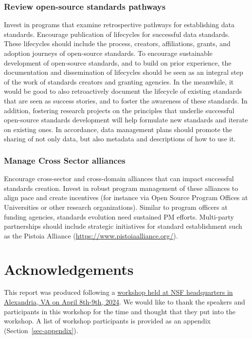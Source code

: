 \documentclass[
  number]{elsarticle}
\begin{document}
\subsubsection{Review open-source standards
pathways}\label{review-open-source-standards-pathways}

Invest in programs that examine retrospective pathways for establishing
data standards. Encourage publication of lifecycles for successful data
standards. These lifecycles should include the process, creators,
affiliations, grants, and adoption journeys of open-source standards. To
encourage sustainable development of open-source standards, and to build
on prior experience, the documentation and dissemination of lifecycles
should be seen as an integral step of the work of standards creators and
granting agencies. In the meanwhile, it would be good to also
retroactively document the lifecycle of existing standards that are seen
as success stories, and to foster the awareness of these standards. In
addition, fostering research projects on the principles that underlie
successful open-source standards development will help formulate new
standards and iterate on existing ones. In accordance, data management
plans should promote the sharing of not only data, but also metadata and
descriptions of how to use it.

\subsubsection{Manage Cross Sector
alliances}\label{manage-cross-sector-alliances}

Encourage cross-sector and cross-domain alliances that can impact
successful standards creation. Invest in robust program management of
these alliances to align pace and create incentives (for instance via
Open Source Program Offices at Universities or other research
organizations). Similar to program officers at funding agencies,
standards evolution need sustained PM efforts. Multi-party partnerships
should include strategic initiatives for standard establishment such as
the Pistoia Alliance (\url{https://www.pistoiaalliance.org/}).

\section{Acknowledgements}\label{acknowledgements}

This report was produced following a
\href{https://uwescience.github.io/2024-open-source-standards-workshop/}{workshop
held at NSF headquarters in Alexandria, VA on April 8th-9th, 2024}. We
would like to thank the speakers and participants in this workshop for
the time and thought that they put into the workshop. A list of workshop
participants is provided as an appendix (Section~\ref{sec-appendix}).
\end{document}
